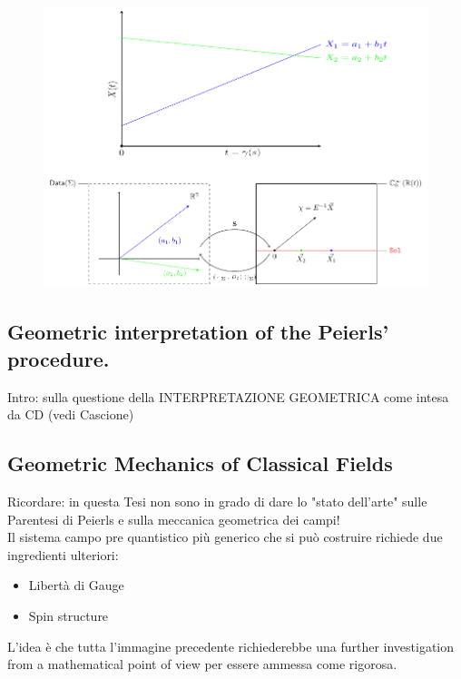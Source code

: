 \documentclass[Main]{subfiles}
\begin{document}
		\begin{figure}[h!]
			\includegraphics[width=\textwidth]{Pictures/Jacobi1D_GeometricPicturePanoramica}	
			\caption{ 
			}	
		\end{figure}		


	\subsection{Geometric interpretation of the Peierls' procedure.}
		Intro: sulla questione della INTERPRETAZIONE GEOMETRICA come intesa da CD (vedi Cascione)



	\subsection{Geometric Mechanics of Classical Fields}
	
\ifToninus
	\begin{Warning}
		Ricordare: in questa Tesi non sono in grado di dare lo "stato dell'arte" sulle Parentesi di Peierls e sulla meccanica geometrica dei campi!\\
		Il sistema campo pre quantistico più generico che si può costruire richiede due ingredienti ulteriori:
		\begin{itemize}
			\item Libertà di Gauge
			\item Spin structure
		\end{itemize}

	L'idea è che tutta l'immagine precedente richiederebbe una further investigation from a mathematical point of view per essere ammessa come rigorosa.
	\end{Warning}
\end{document}

